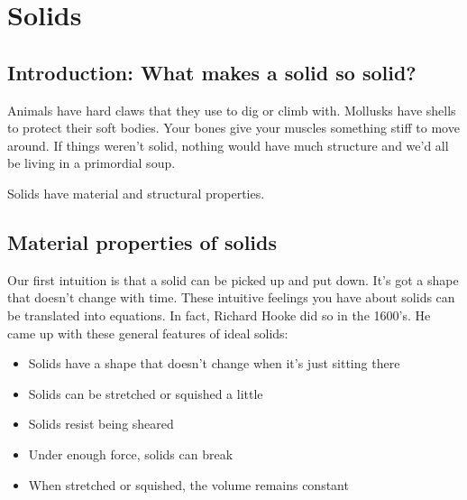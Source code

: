 

\chapter{Solids}
\label{ch:Solids}


\section{Introduction: What makes a solid so solid?}
 Animals have hard claws that they use to dig or climb with. Mollusks have shells to protect their soft bodies. Your bones give your muscles something stiff to move around. If things weren't solid, nothing would have much structure and we'd all be living in a primordial soup.

Solids have material and structural properties.

\section{Material properties of solids} %
 Our first intuition is that a solid can be picked up and put down. It's got a shape that doesn't change with time. These intuitive feelings you have about solids can be translated into equations. In fact, Richard Hooke did so in the 1600's. He came up with these general features of ideal solids: 

\begin{itemize}
\item Solids have a shape that doesn't change when it's just sitting there
\item Solids can be stretched or squished a little
\item Solids resist being sheared
\item Under enough force, solids can break
\item When stretched or squished, the volume remains constant
\end{itemize}

